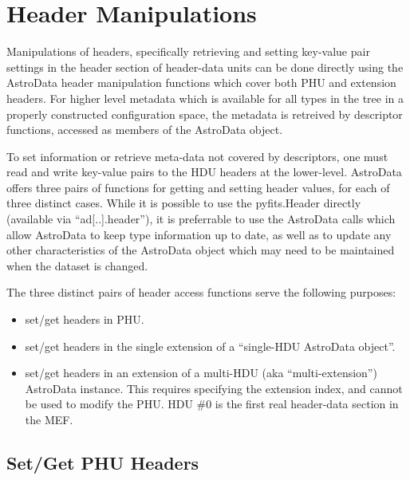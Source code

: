 \documentclass[letterpaper,10pt,english]{sphinxmanual}
\begin{document}
\section{Header Manipulations}
\label{chapter_AstroDataClass:header-manipulations}
Manipulations of headers, specifically retrieving and setting key-value
pair settings in the header section of header-data units
can be done directly using the AstroData header manipulation functions
which cover both PHU and extension headers.
For higher level metadata which is available for all types in the tree
in a properly constructed configuration space, the metadata is retreived by
descriptor functions, accessed as members of the AstroData object.

To set information or retrieve meta-data not covered by descriptors, one must
read and write key-value pairs to the HDU headers at the lower-level. AstroData
offers three pairs of functions for getting and setting header values, for each
of three distinct cases.  While it is possible to use the pyfits.Header directly
(available via ``ad{[}..{]}.header''), it is preferrable to use the AstroData calls
which allow AstroData to keep type information up to date, as well as to update
any other characteristics of the AstroData object which may need to be
maintained when the dataset is changed.

The three distinct pairs of header access functions serve the following
purposes:
\begin{itemize}
\item {} 
set/get headers in PHU.

\item {} 
set/get headers in the single extension of a ``single-HDU AstroData
object''.

\item {} 
set/get headers in an extension of a multi-HDU (aka ``multi-extension'')
AstroData instance. This requires specifying the extension index, and
cannot be used to modify the PHU. HDU \#0 is the first real
header-data section in the MEF.

\end{itemize}


\subsection{Set/Get PHU Headers}
\label{chapter_AstroDataClass:set-get-phu-headers}
\end{document}
